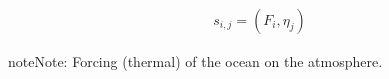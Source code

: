 \documentclass[letterpaper,10pt,english]{sphinxmanual}
\begin{document}
\begin{fulllineitems}
\begin{fulllineitems}
\end{fulllineitems}


\begin{fulllineitems}
\label{rstfiles/inprod_analytic:inprod_analytic.atm_tensors.calculate_s}~\begin{equation*}
\begin{split}s_{i,j} = (F_i, \eta_j)\end{split}
\end{equation*}
\begin{notice}{note}{Note:}
Forcing (thermal) of the ocean on the atmosphere.
\end{notice}

\end{fulllineitems}


\end{fulllineitems}

\end{document}
